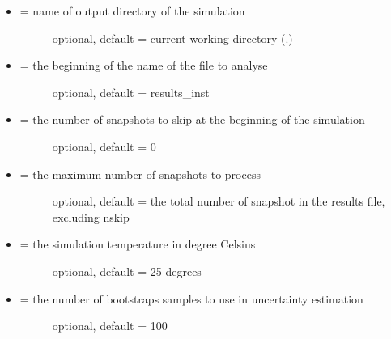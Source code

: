 \documentclass[letterpaper,10pt,english]{manual}
\begin{document}
\begin{itemize}
\item {} \begin{description}
\item[{ = name of output directory of the simulation}] \leavevmode
optional, default = current working directory (.)

\end{description}

\item {} \begin{description}
\item[{ = the beginning of the name of the file to analyse}] \leavevmode
optional, default = results\_inst

\end{description}

\item {} \begin{description}
\item[{ = the number of snapshots to skip at the beginning of the simulation}] \leavevmode
optional, default = 0

\end{description}

\item {} \begin{description}
\item[{ = the maximum number of snapshots to process}] \leavevmode
optional, default = the total number of snapshot in the results file, excluding nskip

\end{description}

\item {} \begin{description}
\item[{ = the simulation temperature in degree Celsius}] \leavevmode
optional, default = 25 degrees

\end{description}

\item {} \begin{description}
\item[{ = the number of bootstraps samples to use in uncertainty estimation}] \leavevmode
optional, default = 100


\end{description}
\end{itemize}
\end{document}

